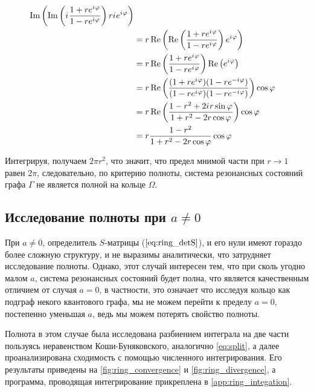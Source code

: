 \begin{align*}
   \operatorname{Im} \left(  \operatorname{Im} \left( {i\mkern1mu} \frac{1 + r e^{{i\mkern1mu} \varphi}}{1 - r e^{{i\mkern1mu} \varphi}} \right) r {i\mkern1mu} e^{{i\mkern1mu} \varphi} \right)
\\ &= r \operatorname{Re} \left(  \operatorname{Re} \left( \frac{1 + r e^{{i\mkern1mu} \varphi}}{1 - r e^{{i\mkern1mu} \varphi}} \right) e^{{i\mkern1mu} \varphi} \right)
\\ &= r \operatorname{Re} \left( \frac{1 + r e^{{i\mkern1mu} \varphi}}{1 - r e^{{i\mkern1mu} \varphi}} \right) \operatorname{Re} \left(   e^{{i\mkern1mu} \varphi} \right)
\\ &= r \operatorname{Re} \left( \frac{(1 + r e^{{i\mkern1mu} \varphi}) (1 - r e^{-{i\mkern1mu} \varphi}) }{(1 - r e^{{i\mkern1mu} \varphi}) (1 - r e^{-{i\mkern1mu} \varphi})} \right) \cos \varphi
\\ &= r \operatorname{Re} \left( \frac{1 - r^2 + 2 {i\mkern1mu} r \sin \varphi}{1 + r^2 - 2 r \cos \varphi} \right) \cos \varphi
\\ &= r \frac{1 - r^2}{1 + r^2 - 2 r \cos \varphi} \cos \varphi 
\end{align*}

Интегрируя, получаем $2 \pi r^2$, что значит, что предел мнимой части при $r \to 1$ равен $2 \pi$, следовательно, по критерию полноты, система резонансных состояний графа $\Gamma$ не является полной на кольце $\Omega$.


\subsection{Исследование полноты при $a \ne 0$}

При $a \ne 0$, определитель $S$-матрицы ($\ref{eq:ring_detS}$), и его нули имеют гораздо более сложную структуру, и не выразимы аналитически, что затрудняет исследование полноты. Однако, этот случай интересен тем, что при сколь угодно малом $a$, система резонансных состояний будет полна, что является качественным отличием от случая $a = 0$, в частности, это означает что исследуя кольцо как подграф некого квантового графа, мы не можем перейти к пределу $a=0$, постепенно уменьшая $a$, ведь мы можем потерять свойство полноты.

Полнота в этом случае была исследована разбиением интеграла на две части пользуясь неравенством Коши-Буняковского, аналогично \ref{eq:split}, а далее проанализирована сходимость с помощью численного интегрирования. Его результаты приведены на \autoref{fig:ring_convergence} и \autoref{fig:ring_divergence}, а программа, проводящая интегрирование прикреплена в \autoref{app:ring_integation}.


